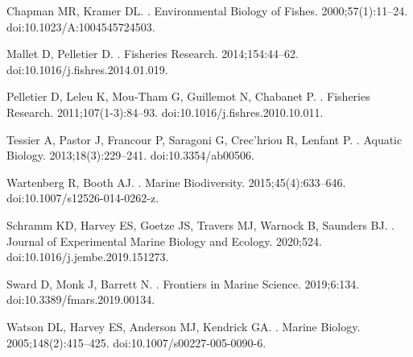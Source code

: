 \documentclass[10pt,letterpaper]{article}
\begin{document}
\begin{thebibliography}{10}
Chapman MR, Kramer DL.
.
\newblock Environmental Biology of Fishes. 2000;57(1):11--24.
\newblock doi:{10.1023/A:1004545724503}.

Mallet D, Pelletier D.
.
\newblock Fisheries Research. 2014;154:44--62.
\newblock doi:{10.1016/j.fishres.2014.01.019}.

Pelletier D, Leleu K, Mou-Tham G, Guillemot N, Chabanet P.
.
\newblock Fisheries Research. 2011;107(1-3):84--93.
\newblock doi:{10.1016/j.fishres.2010.10.011}.

Tessier A, Pastor J, Francour P, Saragoni G, Crec'hriou R, Lenfant P.
.
\newblock Aquatic Biology. 2013;18(3):229--241.
\newblock doi:{10.3354/ab00506}.

Wartenberg R, Booth AJ.
.
\newblock Marine Biodiversity. 2015;45(4):633--646.
\newblock doi:{10.1007/s12526-014-0262-z}.

Schramm KD, Harvey ES, Goetze JS, Travers MJ, Warnock B, Saunders BJ.
.
\newblock Journal of Experimental Marine Biology and Ecology. 2020;524.
\newblock doi:{10.1016/j.jembe.2019.151273}.

Sward D, Monk J, Barrett N.
.
\newblock Frontiers in Marine Science. 2019;6:134.
\newblock doi:{10.3389/fmars.2019.00134}.

Watson DL, Harvey ES, Anderson MJ, Kendrick GA.
.
\newblock Marine Biology. 2005;148(2):415--425.
\newblock doi:{10.1007/s00227-005-0090-6}.


\end{thebibliography}
\end{document}
